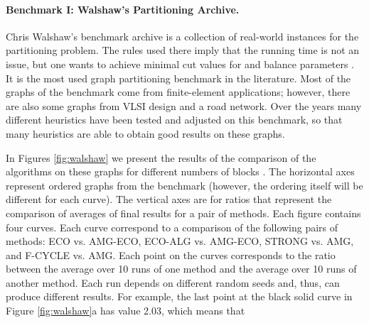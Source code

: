 \documentclass{llncs}
\begin{document}
\paragraph{Benchmark I: Walshaw's Partitioning Archive.} Chris Walshaw's benchmark archive \cite{soper2004combined} is a collection of real-world instances for the partitioning problem. The rules used there imply that the running time is not an issue, but one wants to achieve minimal cut values for  and balance parameters . It is the most used graph partitioning benchmark in the literature. 
Most of the graphs of the benchmark come from finite-element applications; however, there are also some graphs from VLSI design and a road network. Over the years many different heuristics have been tested and adjusted on this benchmark, so that many heuristics are able to obtain good results on these graphs.
\par In Figures \ref{fig:walshaw} we present the results of the comparison of the algorithms on these graphs for different numbers of blocks . 
The horizontal axes represent ordered graphs from the benchmark (however, the ordering itself will be different for each curve). 
The vertical axes are for ratios that represent the comparison of averages of final results for a pair of methods. Each figure contains four curves.
Each curve correspond to a comparison of the following pairs of methods: 
 ECO vs. AMG-ECO, ECO-ALG vs. AMG-ECO, STRONG vs. AMG, and F-CYCLE vs. AMG. Each point on the curves corresponds to the ratio between the average over 10 runs of one method and the average over 10 runs of another method. Each run depends on different random seeds and, thus, can produce different results. For example, the last point at the black solid curve in Figure \ref{fig:walshaw}a has value 2.03, which means that
\end{document}
